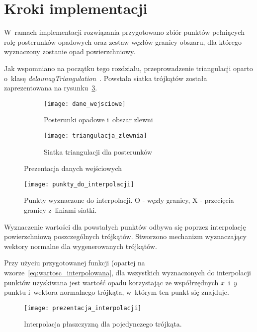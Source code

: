 \section{Kroki implementacji}
W~ramach implementacji rozwiązania przygotowano zbiór punktów pełniących rolę posterunków opadowych oraz zestaw węzłów granicy obszaru, dla którego wyznaczony zostanie opad powierzchniowy.

Jak wspomniano na początku tego rozdziału, przeprowadzenie triangulacji oparto o~klasę \textit{delaunayTriangulation}~\cite{delaunayTriangulation}. Powstała siatka trójkątów została zaprezentowana na rysunku~\ref{fig:triagnulacja_danych}.

\begin{figure}[!ht]
	\centering
\begin{subfigure}{1\textwidth}
	\centering
	\texttt{[image: dane\_wejsciowe]}
	\caption{Posterunki opadowe i~obszar zlewni}
	\label{fig:dane_wejsciowe}
\end{subfigure}	
	\begin{subfigure}{1\textwidth}
	\centering
	\texttt{[image: triangulacja\_zlewnia]}
	\caption{Siatka triangulacji dla posterunków}
	\label{fig:triagnulacja_danych}
\end{subfigure}	
\caption{Prezentacja danych wejściowych}
	
\end{figure}


\begin{figure}[!ht]
	\centering
	\texttt{[image: punkty\_do\_interpolacji]}
	\caption{Punkty wyznaczone do interpolacji.
	O - węzły granicy, X - przecięcia granicy z~liniami siatki.}
	\label{fig:punkty_interpolacji}
\end{figure}

Wyznaczenie wartości dla powstałych punktów odbywa się poprzez interpolację powierzchniową poszczególnych trójkątów. Stworzono mechanizm wyznaczający wektory normalne dla wygenerowanych trójkątów. 

Przy użyciu przygotowanej funkcji (opartej na wzorze~\ref{eq:wartosc_interpolowana}, dla wszystkich wyznaczonych do interpolacji punktów uzyskiwana jest wartość opadu korzystając ze współrzędnych $x$~i~$y$ punktu i~wektora normalnego trójkąta, w~którym ten punkt się znajduje.

\begin{figure}[!ht]
	\centering
	\texttt{[image: prezentacja\_interpolacji]}
	\caption{Interpolacja płaszczyzną dla pojedynczego trójkąta.}
	\label{fig:plaszczyzna_interpolacji}
\end{figure}


